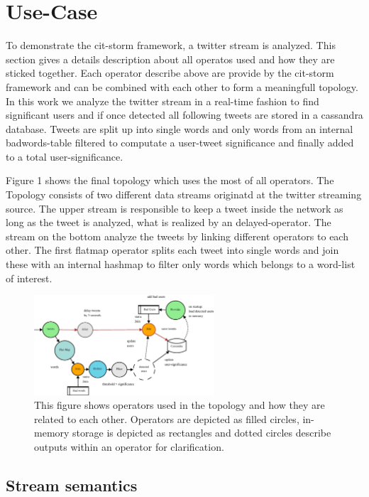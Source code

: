 \section{Use-Case}
\label{sect:useCase}

To demonstrate the cit-storm framework, a twitter stream is analyzed. This section gives a details description about all operatos used and how they are sticked together. Each operator describe above are provide by the cit-storm framework and can be combined with each other to form a meaningfull topology. In this work we analyze the twitter stream in a real-time fashion to find significant users and if once detected all following tweets are stored in a cassandra database. Tweets are split up into single words and only words from an internal badwords-table filtered to computate a user-tweet significance and finally added to a total user-significance. \newline

Figure 1 shows the final topology which uses the most of all operators. The Topology consists of two different data streams originatd at the twitter streaming source. The upper stream is responsible to keep a tweet inside the network as long as the tweet is analyzed, what is realized by an delayed-operator. The stream on the bottom analyze the tweets by linking different operators to each other. The first flatmap operator splits each tweet into single words and join these with an internal hashmap to filter only words which belongs to a word-list of interest.

\begin{figure}[h]
  \centering
  \includegraphics[width=0.6\textwidth]{images/AnalyzeTweetsTopology}
  \caption{This figure shows operators used in the topology and how they are related to each other. Operators are depicted as filled circles, in-memory storage is depicted as rectangles and dotted circles describe outputs within an operator for clarification.}
\end{figure}

\subsection{Stream semantics}

